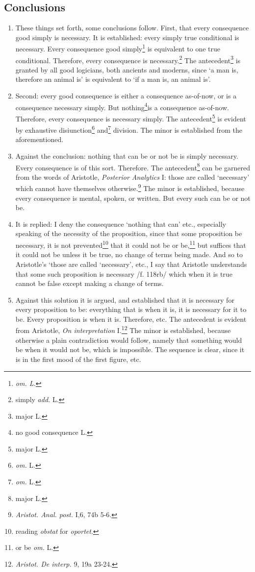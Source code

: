 \documentclass[]{article}
\begin{document}
\begin{enumerate}
\end{enumerate}
\subsection{Conclusions}
\begin{enumerate}
	\item[7.] These things set forth, some conclusions follow. First, that every consequence good simply is necessary. It is established: every simply true conditional is necessary. Every consequence good simply\footnote{\textit{om. L.}} is equivalent to one true conditional. Therefore, every consequence is necessary.\footnote{simply \textit{add.} L.} The antecedent\footnote{major L.} is granted by all good logicians, both ancients and moderns, since  `a man is, therefore an animal is' is equivalent to `if a man is, an animal is'.
	\item[8.] Second: every good consequence is either a consequence as-of-now, or is a consequence necessary simply. But nothing\footnote{no good consequence L.}is a consequence as-of-now. Therefore, every consequence is necessary simply. The antecedent\footnote{major L.} is evident by exhaustive disiunction\footnote{\textit{om.} L.} and\footnote{\textit{om.} L.} division. The minor is established from the aforementioned.
	\item[9.] Against the conclusion: nothing that can be or not be is simply necessary. Every consequence is of this sort. Therefore. The antecedent\footnote{major L.} can be garnered from the words of Aristotle, \textit{Posterior Analytics} I: those are called `necessary' which cannot have themselves otherwise.\footnote{\textit{Aristot. Anal. post.} I,6, 74b 5-6.} The minor is established, because every consequence is mental, spoken, or written. But every such can be or not be.
	\item[10.] It is replied: I deny the consequence `nothing that can' etc., especially speaking of the necessity of the proposition, since that some proposition be necessary, it is not prevented\footnote{reading \textit{obstat} for \textit{oportet}.} that it could not be or be,\footnote{or be \textit{om.} L.} but suffices that it could not be unless it be true, no change of terms being made. And so to Aristotle's `those are called `necessary', etc., I say that Aristotle understands that some such proposition is necessary /f. 118rb/ which when it is true cannot be false except making a change of terms.
	\item[11.] Against this solution it is argued, and established that it is necessary for every proposition to be: everything that is when it is, it is necessary for it to be. Every proposition is when it is. Therefore, etc. The antecedent is evident from Aristotle, \textit{On interpretation} I.\footnote{\textit{Aristot. De interp.} 9, 19a 23-24.} The minor is established, because otherwise a plain contradiction would follow, namely that something would be when it would not be, which is impossible. The sequence is clear, since it is in the first mood of the first figure, etc.

\end{enumerate}
\end{document}
